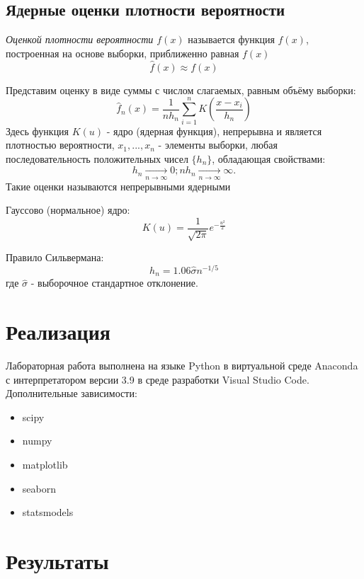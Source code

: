 \documentclass[12pt,a4paper]{article}
\begin{document}
\subsection{Ядерные оценки плотности вероятности}
\textit{Оценкой плотности вероятности $f(x)$} называется функция $\widehat{f}(x)$, построенная на основе выборки, приближенно равная $f(x)$
\begin{equation}
\widehat{f}(x)\approx f(x)
\end{equation}

Представим оценку в виде суммы с числом слагаемых, равным объёму выборки:
\begin{equation}
    \widehat{f}_n(x)=\frac{1}{n h_n}\sum_{i=1}^n{K(\frac{x-x_i}{h_n})}
\end{equation}
Здесь функция $K(u)$ - ядро (ядерная функция), непрерывна и является плотностью вероятности, $x_1,...,x_n$ - элементы выборки, любая последовательность положительных чисел $\{h_n\}$, обладающая свойствами:
\begin{equation}
    h_n\xrightarrow[n\to\infty]{}0;
    n h_n\xrightarrow[n\to\infty]{}\infty.
\end{equation}
Такие оценки называются непрерывными ядерными

Гауссово (нормальное) ядро:
\begin{equation}
    K(u)=\frac{1}{\sqrt{2\pi}}e^{-\frac{u^2}{2}}
\end{equation}

Правило Сильвермана:
\begin{equation}
    h_n=1.06\hat{\sigma}n^{-1/5}
\end{equation}
где $\hat{\sigma}$ - выборочное стандартное отклонение.

\section{Реализация}
Лабораторная работа выполнена на языке Python в виртуальной среде Anaconda с интерпретатором версии 3.9 в среде разработки Visual Studio Code. Дополнительные зависимости:
\begin{itemize}
    \item scipy
    \item numpy
    \item matplotlib
    \item seaborn
    \item statsmodels
\end{itemize}


\section {Результаты}
\end{document}
